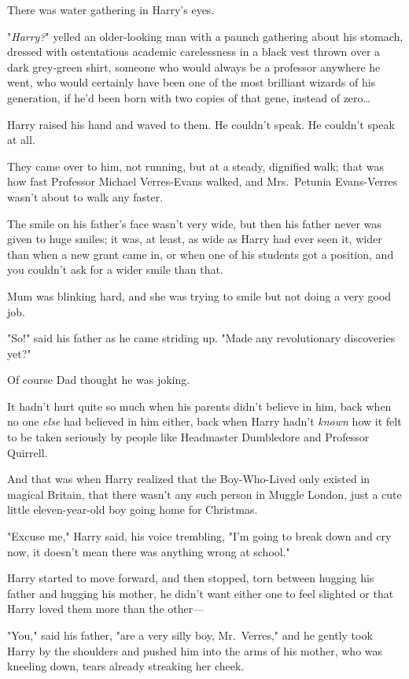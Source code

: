 There was water gathering in Harry's eyes.

"\emph{Harry?}" yelled an older-looking man with a paunch gathering about his
stomach, dressed with ostentatious academic carelessness in a black vest thrown
over a dark grey-green shirt, someone who would always be a professor anywhere
he went, who would certainly have been one of the most brilliant wizards of his
generation, if he'd been born with two copies of that gene, instead of
zero{\ldots}

Harry raised his hand and waved to them. He couldn't speak. He couldn't speak
at all.

They came over to him, not running, but at a steady, dignified walk; that was
how fast Professor Michael Verres-Evans walked, and Mrs.~Petunia Evans-Verres
wasn't about to walk any faster.

The smile on his father's face wasn't very wide, but then his father never was
given to huge smiles; it was, at least, as wide as Harry had ever seen it,
wider than when a new grant came in, or when one of his students got a
position, and you couldn't ask for a wider smile than that.

Mum was blinking hard, and she was trying to smile but not doing a very good
job.

"So!" said his father as he came striding up. "Made any revolutionary
discoveries yet?"

Of course Dad thought he was joking.

It hadn't hurt quite so much when his parents didn't believe in him, back when
no one \emph{else} had believed in him either, back when Harry hadn't
\emph{known} how it felt to be taken seriously by people like Headmaster
Dumbledore and Professor Quirrell.

And that was when Harry realized that the Boy-Who-Lived only existed in magical
Britain, that there wasn't any such person in Muggle London, just a cute little
eleven-year-old boy going home for Christmas.

"Excuse me," Harry said, his voice trembling, "I'm going to break down and cry
now, it doesn't mean there was anything wrong at school."

Harry started to move forward, and then stopped, torn between hugging his
father and hugging his mother, he didn't want either one to feel slighted or
that Harry loved them more than the other---

"You," said his father, "are a very silly boy, Mr.~Verres," and he gently took
Harry by the shoulders and pushed him into the arms of his mother, who was
kneeling down, tears already streaking her cheek.

